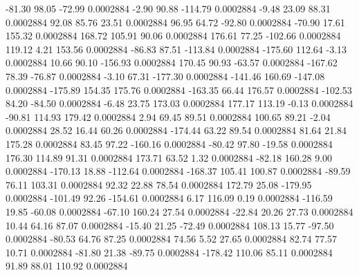       -81.30       98.05      -72.99     0.0002884
       -2.90       90.88     -114.79     0.0002884
       -9.48       23.09       88.31     0.0002884
       92.08       85.76       23.51     0.0002884
       96.95       64.72      -92.80     0.0002884
      -70.90       17.61      155.32     0.0002884
      168.72      105.91       90.06     0.0002884
      176.61       77.25     -102.66     0.0002884
      119.12        4.21      153.56     0.0002884
      -86.83       87.51     -113.84     0.0002884
     -175.60      112.64       -3.13     0.0002884
       10.66       90.10     -156.93     0.0002884
      170.45       90.93      -63.57     0.0002884
     -167.62       78.39      -76.87     0.0002884
       -3.10       67.31     -177.30     0.0002884
     -141.46      160.69     -147.08     0.0002884
     -175.89      154.35      175.76     0.0002884
     -163.35       66.44      176.57     0.0002884
     -102.53       84.20      -84.50     0.0002884
       -6.48       23.75      173.03     0.0002884
      177.17      113.19       -0.13     0.0002884
      -90.81      114.93      179.42     0.0002884
        2.94       69.45       89.51     0.0002884
      100.65       89.21       -2.04     0.0002884
       28.52       16.44       60.26     0.0002884
     -174.44       63.22       89.54     0.0002884
       81.64       21.84      175.28     0.0002884
       83.45       97.22     -160.16     0.0002884
      -80.42       97.80      -19.58     0.0002884
      176.30      114.89       91.31     0.0002884
      173.71       63.52        1.32     0.0002884
      -82.18      160.28        9.00     0.0002884
     -170.13       18.88     -112.64     0.0002884
     -168.37      105.41      100.87     0.0002884
      -89.59       76.11      103.31     0.0002884
       92.32       22.88       78.54     0.0002884
      172.79       25.08     -179.95     0.0002884
     -101.49       92.26     -154.61     0.0002884
        6.17      116.09        0.19     0.0002884
     -116.59       19.85      -60.08     0.0002884
      -67.10      160.24       27.54     0.0002884
      -22.84       20.26       27.73     0.0002884
       10.44       64.16       87.07     0.0002884
      -15.40       21.25      -72.49     0.0002884
      108.13       15.77      -97.50     0.0002884
      -80.53       64.76       87.25     0.0002884
       74.56        5.52       27.65     0.0002884
       82.74       77.57       10.71     0.0002884
      -81.80       21.38      -89.75     0.0002884
     -178.42      110.06       85.11     0.0002884
       91.89       88.01      110.92     0.0002884
